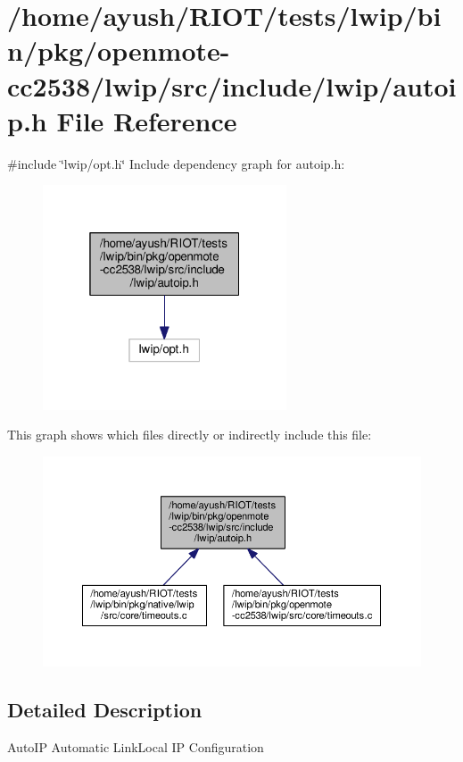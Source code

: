 \hypertarget{openmote-cc2538_2lwip_2src_2include_2lwip_2autoip_8h}{}\section{/home/ayush/\+R\+I\+O\+T/tests/lwip/bin/pkg/openmote-\/cc2538/lwip/src/include/lwip/autoip.h File Reference}
\label{openmote-cc2538_2lwip_2src_2include_2lwip_2autoip_8h}
{\ttfamily \#include \char`\"{}lwip/opt.\+h\char`\"{}}\newline
Include dependency graph for autoip.\+h\+:
\nopagebreak
\begin{figure}[H]
\begin{center}
\leavevmode
\includegraphics[width=205pt]{openmote-cc2538_2lwip_2src_2include_2lwip_2autoip_8h__incl}
\end{center}
\end{figure}
This graph shows which files directly or indirectly include this file\+:
\nopagebreak
\begin{figure}[H]
\begin{center}
\leavevmode
\includegraphics[width=350pt]{openmote-cc2538_2lwip_2src_2include_2lwip_2autoip_8h__dep__incl}
\end{center}
\end{figure}


\subsection{Detailed Description}
Auto\+IP Automatic Link\+Local IP Configuration 